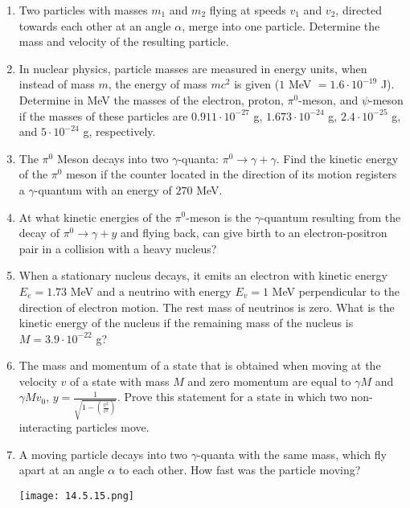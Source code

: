 \documentclass{article}
\begin{document}
\begin{enumerate}[label=14.5.\arabic*]
\item Two particles with masses $m_1$ and $m_2$ flying at speeds $v_1$ and $v_2$, directed towards each other at an angle $\alpha$, merge into one particle. Determine the mass and velocity of the resulting particle.

\item In nuclear physics, particle masses are measured in energy units, when instead of mass $m$, the energy of mass $mc^2$ is given ($1$ MeV $= 1.6 \cdot 10^{-19}$ J). Determine in MeV the masses of the electron, proton, $\pi^0$-meson, and $\psi$-meson if the masses of these particles are $0.911 \cdot 10^{-27}$ g, $1.673 \cdot 10^{-24}$ g, $2.4 \cdot 10^{-25}$ g, and $5 \cdot 10^{-24}$ g, respectively.

\item The $\pi^0$ Meson decays into two $\gamma$-quanta: $\pi^0 \to \gamma + \gamma$. Find the kinetic energy of the $\pi^0$ meson if the counter located in the direction of its motion registers a $\gamma$-quantum with an energy of $270$ MeV.

\item At what kinetic energies of the $\pi^0$-meson is the $\gamma$-quantum resulting from the decay of $\pi^0 \to \gamma + y$ and flying back, can give birth to an electron-positron pair in a collision with a heavy nucleus?

\item When a stationary nucleus decays, it emits an electron with kinetic energy $E_e = 1.73$ MeV and a neutrino with energy $E_v = 1$ MeV perpendicular to the direction of electron motion. The rest mass of neutrinos is zero. What is the kinetic energy of the nucleus if the remaining mass of the nucleus is $M = 3.9 \cdot 10^{-22}$ g? 

\item The mass and momentum of a state that is obtained when moving at the velocity $v$ of a state with mass $M$ and zero momentum are equal to $\gamma M$ and $\gamma M v_0$, $y = \frac{1}{\sqrt{1 - (\frac{v^2}{c^2})}}$. Prove this statement for a state in which two non-interacting particles move.

\item A moving particle decays into two $\gamma$-quanta with the same mass, which fly apart at an angle $\alpha$ to each other. How fast was the particle moving?

\begin{center}
    \texttt{[image: 14.5.15.png]}
\end{center}


\end{enumerate}
\end{document}
